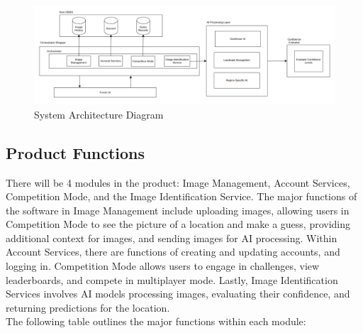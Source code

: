 \documentclass[]{article}
\begin{document}
\begin{figure}[h]
    \centering
    \includegraphics[width=1\linewidth]{system_diagram.png}
    \caption{System Architecture Diagram}
    \label{fig:system_diagram}
\end{figure}

\subsection{Product Functions}
\label{sub:product_functions}

\noindent There will be 4 modules in the product: Image Management, Account Services, Competition Mode, and the Image Identification Service. The major functions of the software in Image  Management include uploading images, allowing users in Competition Mode to see the picture of a location and make a guess, providing additional context for images, and sending images for AI processing. Within Account Services, there are functions of creating and updating accounts, and logging in. Competition Mode allows users to engage in challenges, view leaderboards, and compete in multiplayer mode. Lastly, Image Identification Services involves AI models processing images, evaluating their confidence, and returning predictions for the location.\\

\noindent The following table outlines the major functions within each module:
\end{document}
